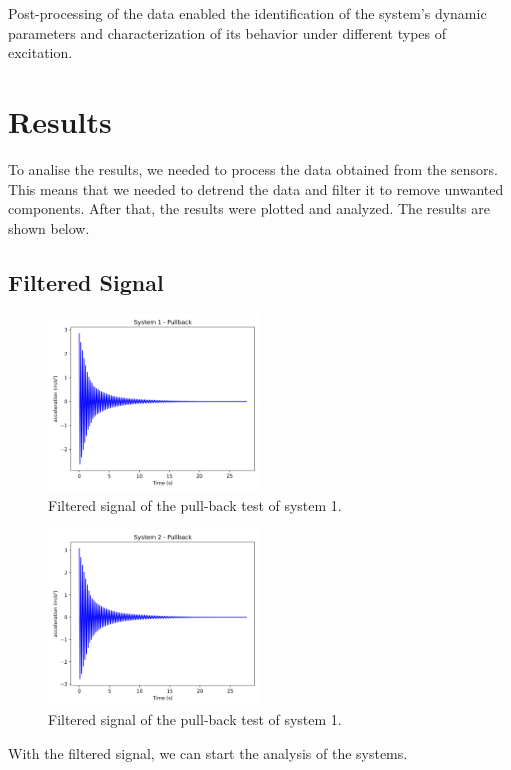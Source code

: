 \documentclass{article}  %
\begin{document}
Post-processing of the data enabled the identification of the system’s dynamic parameters and characterization of its behavior under different types of excitation.

\newpage
\section{Results}
To analise the results, we needed to process the data obtained from the sensors. This means that we needed to detrend the data and filter it to remove unwanted components. After that, the results were plotted and analyzed. The results are shown below.
\subsection{Filtered Signal}
\begin{figure}[h]
  \centering
  \includegraphics[width=0.5\textwidth]{GRAFICOS/pullback_first.png}
  \caption{Filtered signal of the pull-back test of system 1.}
  \label{fig:filtered_signal1}
\end{figure}

\begin{figure}[h]
  \centering
  \includegraphics[width=0.5\textwidth]{GRAFICOS/pullback_second.png}
  \caption{Filtered signal of the pull-back test of system 1.}
  \label{fig:filtered_signal2}
\end{figure}

With the filtered signal, we can start the analysis of the systems.
\end{document}
